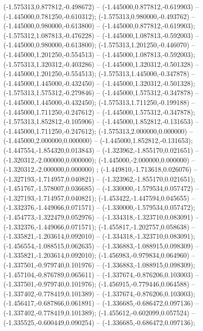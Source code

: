  (-1.575313,0.877812,-0.498672) -- (-1.445000,0.877812,-0.619903) -- (-1.445000,0.781250,-0.610312);
 (-1.575313,0.980000,-0.493762) -- (-1.445000,0.980000,-0.613800) -- (-1.445000,0.877812,-0.619903);
 (-1.575312,1.087813,-0.476228) -- (-1.445000,1.087813,-0.592003) -- (-1.445000,0.980000,-0.613800);
 (-1.575313,1.201250,-0.446070) -- (-1.445000,1.201250,-0.554513) -- (-1.445000,1.087813,-0.592003);
 (-1.575313,1.320312,-0.403286) -- (-1.445000,1.320312,-0.501328) -- (-1.445000,1.201250,-0.554513);
 (-1.575313,1.445000,-0.347878) -- (-1.445000,1.445000,-0.432450) -- (-1.445000,1.320312,-0.501328);
 (-1.575313,1.575312,-0.279846) -- (-1.445000,1.575312,-0.347878) -- (-1.445000,1.445000,-0.432450);
 (-1.575313,1.711250,-0.199188) -- (-1.445000,1.711250,-0.247612) -- (-1.445000,1.575312,-0.347878);
 (-1.575313,1.852812,-0.105906) -- (-1.445000,1.852812,-0.131653) -- (-1.445000,1.711250,-0.247612);
 (-1.575313,2.000000,0.000000) -- (-1.445000,2.000000,0.000000) -- (-1.445000,1.852812,-0.131653);
 (-1.447554,-1.854320,0.013843) -- (-1.323962,-1.855170,0.021651) -- (-1.320312,-2.000000,0.000000);
 (-1.445000,-2.000000,0.000000) -- (-1.320312,-2.000000,0.000000) ;
 (-1.449810,-1.713618,0.026076) -- (-1.327193,-1.714957,0.040821) -- (-1.323962,-1.855170,0.021651);
 (-1.451767,-1.578007,0.036685) -- (-1.330000,-1.579534,0.057472) -- (-1.327193,-1.714957,0.040821);
 (-1.453422,-1.447594,0.045655) -- (-1.332376,-1.449066,0.071571) -- (-1.330000,-1.579534,0.057472);
 (-1.454773,-1.322479,0.052976) -- (-1.334318,-1.323710,0.083091) -- (-1.332376,-1.449066,0.071571);
 (-1.455817,-1.202757,0.058638) -- (-1.335821,-1.203614,0.092010) -- (-1.334318,-1.323710,0.083091);
 (-1.456554,-1.088515,0.062635) -- (-1.336883,-1.088915,0.098309) -- (-1.335821,-1.203614,0.092010);
 (-1.456983,-0.979834,0.064960) -- (-1.337501,-0.979740,0.101976) -- (-1.336883,-1.088915,0.098309);
 (-1.457104,-0.876789,0.065611) -- (-1.337674,-0.876206,0.103003) -- (-1.337501,-0.979740,0.101976);
 (-1.456915,-0.779446,0.064588) -- (-1.337402,-0.778419,0.101389) -- (-1.337674,-0.876206,0.103003);
 (-1.456417,-0.687866,0.061891) -- (-1.336685,-0.686472,0.097136) -- (-1.337402,-0.778419,0.101389);
 (-1.455612,-0.602099,0.057524) -- (-1.335525,-0.600449,0.090254) -- (-1.336685,-0.686472,0.097136);
